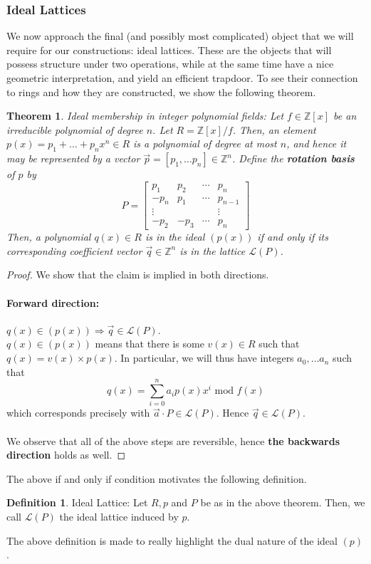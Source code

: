 \documentclass{article}
\newtheorem{theorem}{Theorem}[section]
\theoremstyle{definition}
\newtheorem{definition}{Definition}[section]
\theoremstyle{example}
\renewcommand{\L}{\mathcal{L}}
\newcommand{\Int}{\mathbb{Z}}
\renewcommand{\mod}{\,\,\text{mod}\,\,}
\begin{document}
\subsubsection{Ideal Lattices}
\label{sec:ideal_lattices}
We now approach the final (and possibly most complicated) object that we will
require for our constructions: ideal lattices. These are the objects that will
possess structure under two operations, while at the same time have a nice
geometric interpretation, and yield an efficient trapdoor. To see their
connection to rings and how they are constructed, we show the following theorem.
\begin{theorem}{Ideal membership in integer polynomial fields:}
 Let $f \in \Int[x]$ be an irreducible polynomial of degree $n$. Let $R = \Int[x]/f$. Then, an
 element $p(x) = p_1 + \hdots + p_nx^n\in R$ is a polynomial of degree at most $n$, and hence it may be
 represented by a vector $\vec{p} = [p_1, \hdots p_n] \in \Int^n$. Define the \textbf{rotation
   basis} of $p$ by
 \[
   P =
   \begin{bmatrix}
     p_1 & p_2 & \cdots & p_n \\
     -p_n & p_1 & \cdots & p_{n - 1} \\
     \vdots & & & \vdots \\
     -p_2 & -p_3 & \cdots & p_n
   \end{bmatrix}
 \]
 Then, a polynomial $q(x) \in R$ is in the ideal $(p(x))$ if and only if its
 corresponding coefficient vector $\vec{q} \in \Int^n$ is in the lattice $\L(P)$. 
\end{theorem}
\begin{proof}
  We show that the claim is implied in both directions.
  \paragraph{Forward direction:} $q(x) \in (p(x)) \Rightarrow \vec{q} \in \L(P)$.\\
  $q(x) \in (p(x))$ means that there is some $v(x) \in R$ such that $q(x) = v(x)
  \times p(x)$. In particular, we will thus have integers $a_0, \hdots a_n$ such that
  \[
    q(x) = \sum_{i = 0}^n a_ip(x)x^i \mod f(x)
  \] which corresponds precisely with
  $\vec{a} \cdot P \in \L(P)$. Hence $\vec{q} \in \L(P)$.
\paragraph{} We observe that all of the above steps are reversible, hence \textbf{the
backwards direction} holds as well.
\end{proof}
The above if and only if condition motivates the following definition.
\begin{definition}{Ideal Lattice:}
  Let $R, p$ and $P$ be as in the above theorem. Then, we call $\L(P)$ the ideal
  lattice induced by $p$.
\end{definition}
The above definition is made to really highlight the dual nature of the ideal $(p)$.
\end{document}
